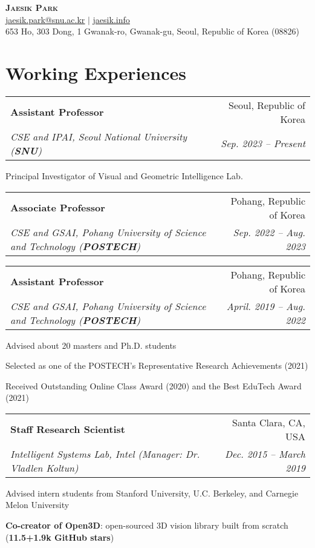 \documentclass[letterpaper,11pt]{article}
\makeatletter
\newcommand{\resumeItem}[1]{
  \small{
  \item{#1 \vspace{-2pt}}
  }
}
\newcommand{\resumeSubheading}[4]{
  \vspace{-2pt}\item
    \begin{tabular*}{0.97\textwidth}[t]{l@{\extracolsep{\fill}}r}
      \textbf{#1} & #2 \\
      \textit{\small#3} & \textit{\small #4} \\
    \end{tabular*}\vspace{-7pt}
}
\newcommand{\resumeSubHeadingListStart}{\begin{itemize}[leftmargin=0.15in, label={}]}
\newcommand{\resumeSubHeadingListEnd}{\end{itemize}}
\newcommand{\resumeItemListStart}{\begin{itemize}}
\newcommand{\resumeItemListEnd}{\end{itemize}\vspace{-5pt}}
\makeatother
\begin{document}
\begin{center}
    \textbf{\Huge \scshape Jaesik Park} \\ \vspace{3pt}
    \small \href{mailto:jaesik.park@snu.ac.kr}{\underline{jaesik.park@snu.ac.kr}} $|$ 
    \href{http://jaesik.info}{\underline{jaesik.info}}\\
    \footnotesize{653 Ho, 303 Dong, 1 Gwanak-ro, Gwanak-gu, Seoul, Republic of Korea (08826)}
\end{center}

\section{Working Experiences}
  \resumeSubHeadingListStart
    \resumeSubheading
      {Assistant Professor}{Seoul, Republic of Korea}
      {CSE and IPAI, Seoul National University \textnormal{(\textbf{SNU})}}{Sep. 2023 -- Present}
      \resumeItemListStart
        \resumeItem{Principal Investigator of Visual and Geometric Intelligence Lab.}
      \resumeItemListEnd
    \resumeSubheading
      {Associate Professor}{Pohang, Republic of Korea}
      {CSE and GSAI, Pohang University of Science and Technology \textnormal{(\textbf{POSTECH})}}{Sep. 2022 -- Aug. 2023}
    \resumeSubheading
      {Assistant Professor}{Pohang, Republic of Korea}
      {CSE and GSAI, Pohang University of Science and Technology \textnormal{(\textbf{POSTECH})}}{April. 2019 -- Aug. 2022}
      \resumeItemListStart
        \resumeItem{Advised about 20 masters and Ph.D. students}
        \resumeItem{Selected as one of the POSTECH's Representative Research Achievements (2021)}
        \resumeItem{Received Outstanding Online Class Award (2020) and the Best EduTech Award (2021)}
      \resumeItemListEnd
    \resumeSubheading
      {Staff Research Scientist}{Santa Clara, CA, USA}
      {Intelligent Systems Lab, Intel (Manager: Dr. Vladlen Koltun)}{Dec. 2015 -- March 2019}
        \resumeItemListStart
          \resumeItem{Advised intern students from Stanford University, U.C. Berkeley, and Carnegie Melon University}
          \resumeItem{\textbf{Co-creator of Open3D}: open-sourced 3D vision library built from scratch (\textbf{11.5+1.9k GitHub stars})}
        \resumeItemListEnd
  \resumeSubHeadingListEnd
\end{document}
